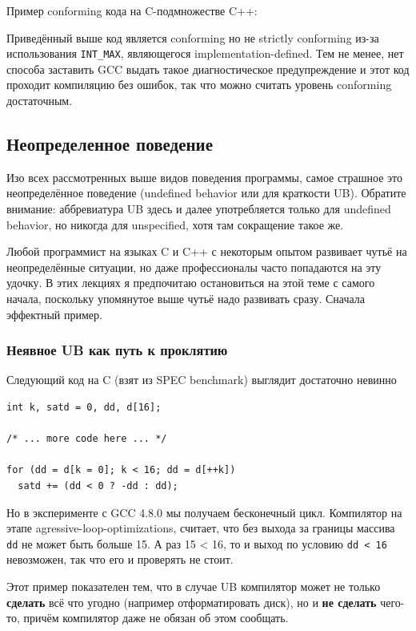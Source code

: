 \documentclass[a4paper,12pt,oneside]{article}
\begin{document}
Пример conforming кода на C-подмножестве C++:



Приведённый выше код является conforming но не strictly conforming из-за использования \lstinline!INT_MAX!, являющегося implementation-defined. Тем не менее, нет способа заставить GCC выдать такое диагностическое предупреждение и этот код проходит компиляцию без ошибок, так что можно считать уровень conforming достаточным.

\pagebreak
\subsection{Неопределенное поведение}\label{UB}

Изо всех рассмотренных выше видов поведения программы, самое страшное это неопределённое поведение (undefined behavior или для краткости UB). Обратите внимание: аббревиатура UB здесь и далее употребляется только для undefined behavior, но никогда для unspecified, хотя там сокращение такое же.

Любой программист на языках C и C++ с некоторым опытом развивает чутьё на неопределённые ситуации, но даже профессионалы часто попадаются на эту удочку. В этих лекциях я предпочитаю остановиться на этой теме с самого начала, поскольку упомянутое выше чутьё надо развивать сразу. Сначала эффектный пример.

\subsubsection{Неявное UB как путь к проклятию}\label{HiddenUB}

Следующий код на C (взят из SPEC benchmark) выглядит достаточно невинно

\begin{lstlisting}
int k, satd = 0, dd, d[16];

/* ... more code here ... */

for (dd = d[k = 0]; k < 16; dd = d[++k])
  satd += (dd < 0 ? -dd : dd);
\end{lstlisting}

Но в эксперименте с GCC 4.8.0 мы получаем бесконечный цикл. Компилятор на этапе agressive-loop-optimizations, считает, что без выхода за границы массива \lstinline!dd! не может быть больше 15. А раз 15 < 16, то и выход по условию \lstinline!dd < 16! невозможен, так что его и проверять не стоит.

Этот пример показателен тем, что в случае UB компилятор может не только \textbf{сделать} всё что угодно (например отформатировать диск), но и \textbf{не сделать} чего-то, причём компилятор даже не обязан об этом сообщать.
\end{document}

